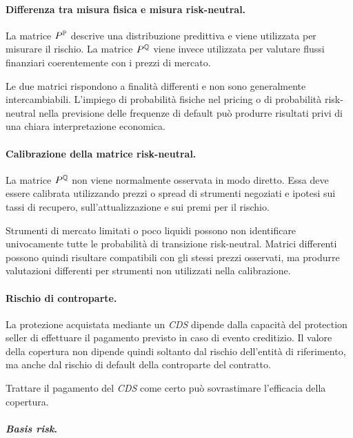 \paragraph{Differenza tra misura fisica e misura risk-neutral.}

La matrice $P^{\mathbb{P}}$ descrive una distribuzione predittiva e viene
utilizzata per misurare il rischio. La matrice $P^{\mathbb{Q}}$ viene invece
utilizzata per valutare flussi finanziari coerentemente con i prezzi di
mercato.

Le due matrici rispondono a finalit\`{a} differenti e non sono
generalmente intercambiabili. L'impiego di probabilit\`{a} fisiche nel
pricing o di probabilit\`{a} risk-neutral nella previsione delle
frequenze di default pu\`{o} produrre risultati privi di una chiara
interpretazione economica.

\paragraph{Calibrazione della matrice risk-neutral.}

La matrice $P^{\mathbb{Q}}$ non viene normalmente osservata in modo diretto.
Essa deve essere calibrata utilizzando prezzi o spread di strumenti
negoziati e ipotesi sui tassi di recupero, sull'attualizzazione e sui
premi per il rischio.

Strumenti di mercato limitati o poco liquidi possono non identificare
univocamente tutte le probabilit\`{a} di transizione risk-neutral.
Matrici differenti possono quindi risultare compatibili con gli stessi
prezzi osservati, ma produrre valutazioni differenti per strumenti non
utilizzati nella calibrazione.

\paragraph{Rischio di controparte.}

La protezione acquistata mediante un \emph{CDS} dipende dalla
capacit\`{a} del protection seller di effettuare il pagamento previsto
in caso di evento creditizio. Il valore della copertura non dipende
quindi soltanto dal rischio dell'entit\`{a} di riferimento, ma anche dal
rischio di default della controparte del contratto.

Trattare il pagamento del \emph{CDS} come certo pu\`{o} sovrastimare
l'efficacia della copertura.

\paragraph{\emph{Basis risk}.}

